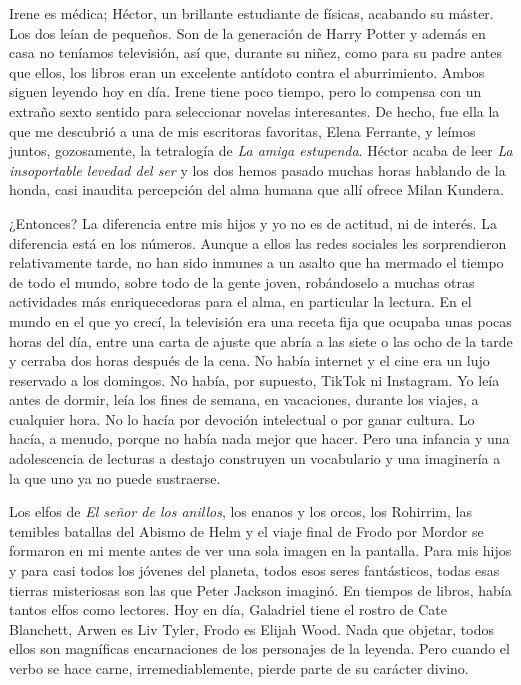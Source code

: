 Irene es médica; Héctor, un brillante estudiante de físicas, acabando su máster. Los dos leían de pequeños. Son de la generación de Harry Potter y además en casa no teníamos televisión, así que, durante su niñez, como para su padre antes que ellos, los libros eran un excelente antídoto contra el aburrimiento. Ambos siguen leyendo hoy en día. Irene tiene poco tiempo, pero lo compensa con un extraño sexto sentido para seleccionar novelas interesantes. De hecho, fue ella la que me descubrió a una de mis escritoras favoritas, Elena Ferrante, y leímos juntos, gozosamente, la tetralogía de \emph{La amiga estupenda}. Héctor acaba de leer \emph{La insoportable levedad del ser} y los dos hemos pasado muchas horas hablando de la honda, casi inaudita percepción del alma humana que allí ofrece Milan Kundera.

¿Entonces? La diferencia entre mis hijos y yo no es de actitud, ni de interés. La diferencia está en los números. Aunque a ellos las redes sociales les sorprendieron relativamente tarde, no han sido inmunes a un asalto que ha mermado el tiempo de todo el mundo, sobre todo de la gente joven, robándoselo a muchas otras actividades más enriquecedoras para el alma, en particular la lectura. En el mundo en el que yo crecí, la televisión era una receta fija que ocupaba unas pocas horas del día, entre una carta de ajuste que abría a las siete o las ocho de la tarde y cerraba dos horas después de la cena. No había internet y el cine era un lujo reservado a los domingos. No había, por supuesto, TikTok ni Instagram. Yo leía antes de dormir, leía los fines de semana, en vacaciones, durante los viajes, a cualquier hora. No lo hacía por devoción intelectual o por ganar cultura. Lo hacía, a menudo, porque no había nada mejor que hacer. Pero una infancia y una adolescencia de lecturas a destajo construyen un vocabulario y una imaginería a la que uno ya no puede sustraerse.

Los elfos de \emph{El señor de los anillos}, los enanos y los orcos, los Rohirrim, las temibles batallas del Abismo de Helm y el viaje final de Frodo por Mordor se formaron en mi mente antes de ver una sola imagen en la pantalla. Para mis hijos y para casi todos los jóvenes del planeta, todos esos seres fantásticos, todas esas tierras misteriosas son las que Peter Jackson imaginó. En tiempos de libros, había tantos elfos como lectores. Hoy en día, Galadriel tiene el rostro de Cate Blanchett, Arwen es Liv Tyler, Frodo es Elijah Wood. Nada que objetar, todos ellos son magníficas encarnaciones de los personajes de la leyenda. Pero cuando el verbo se hace carne, irremediablemente, pierde parte de su carácter divino.

